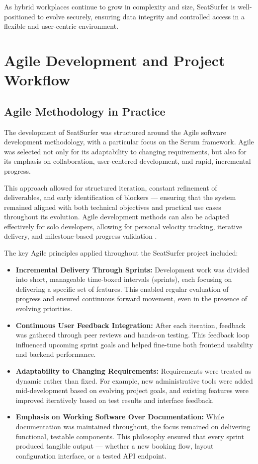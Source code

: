 \documentclass[12pt,a4paper]{report} %
\begin{document}
As hybrid workplaces continue to grow in complexity and size, SeatSurfer is well-positioned to evolve securely, ensuring data integrity and controlled access in a flexible and user-centric environment.

\newpage

\chapter{Agile Development and Project Workflow}

\section{Agile Methodology in Practice}

The development of SeatSurfer was structured around the Agile software development methodology, with a particular focus on the Scrum framework. Agile was selected not only for its adaptability to changing requirements, but also for its emphasis on collaboration, user-centered development, and rapid, incremental progress.

This approach allowed for structured iteration, constant refinement of deliverables, and early identification of blockers — ensuring that the system remained aligned with both technical objectives and practical use cases throughout its evolution. Agile development methods can also be adapted effectively for solo developers, allowing for personal velocity tracking, iterative delivery, and milestone-based progress validation \cite{smith2022agile}.

The key Agile principles applied throughout the SeatSurfer project included:

\begin{itemize}
\item \textbf{Incremental Delivery Through Sprints:}
Development work was divided into short, manageable time-boxed intervals (sprints), each focusing on delivering a specific set of features. This enabled regular evaluation of progress and ensured continuous forward movement, even in the presence of evolving priorities.
\item \textbf{Continuous User Feedback Integration:}  
After each iteration, feedback was gathered through peer reviews and hands-on testing. This feedback loop influenced upcoming sprint goals and helped fine-tune both frontend usability and backend performance.
\item \textbf{Adaptability to Changing Requirements:}  
Requirements were treated as dynamic rather than fixed. For example, new administrative tools were added mid-development based on evolving project goals, and existing features were improved iteratively based on test results and interface feedback.
\item \textbf{Emphasis on Working Software Over Documentation:}  
While documentation was maintained throughout, the focus remained on delivering functional, testable components. This philosophy ensured that every sprint produced tangible output — whether a new booking flow, layout configuration interface, or a tested API endpoint.
\end{itemize}
\end{document}
